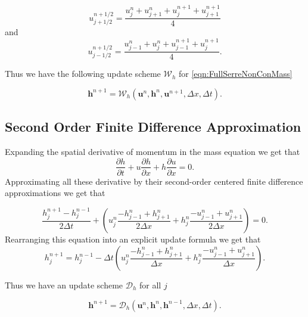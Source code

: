 	\begin{equation*}
	u^{n + 1/2}_{j+ 1/2} = \frac{ u^{n}_{j} + u^{n}_{j+1} + u^{n+1}_{j} +   u^{n+1}_{j+1}  }{4}
	\end{equation*}
	and
	\begin{equation*}
	u^{n + 1/2}_{j- 1/2} = \frac{u^{n}_{j-1}  + u^{n}_{j}+ u^{n+1}_{j-1} + u^{n+1}_{j}   }{4}.
	\end{equation*}

Thus we have the following update scheme $\mathcal{W}_h$ for \eqref{eqn:FullSerreNonConMass}

	\begin{equation}
	\boldsymbol{h}^{n+1} = \mathcal{W}_h\left(\boldsymbol{u}^n,\boldsymbol{h}^n,\boldsymbol{u}^{n+1}, \Delta x, \Delta t \right). 
	\label{eq:LWupdateh}
	\end{equation}

\subsection{Second Order Finite Difference Approximation}
Expanding the spatial derivative of momentum in the mass equation we get that	\begin{equation*}
\frac{\partial h}{\partial t} + u\dfrac{\partial h}{\partial x} + h\dfrac{\partial u}{\partial x} = 0.
\end{equation*}
Approximating all these derivative by their second-order centered finite difference approximations we get that

	\begin{equation*}
	\frac{h^{n+1}_j -h^{n-1}_j} {2 \Delta t} + \left(u^{n}_{j}\frac{ - h^{n}_{j-1} + h^{n}_{j+1}}{2 \Delta x} + h^{n}_{j}\frac{- u^{n}_{j-1} + u^{n}_{j+1}}{2\Delta x}\right) = 0.
	\end{equation*}
Rearranging this equation into an explicit update formula we get that		
	\begin{equation*}
	h^{n+1}_j = h^{n-1}_j - \Delta t \left(u^{n}_{j}\frac{ - h^{n}_{j-1} + h^{n}_{j+1}}{\Delta x} + h^{n}_{j}\frac{- u^{n}_{j-1} + u^{n}_{j+1}}{\Delta x}\right).
	\end{equation*}

Thus we have an update scheme $\mathcal{D}_h$ for all $j$

	\begin{equation}
	\label{eq:secondFDappformass}
	\boldsymbol{h}^{n+1} = \mathcal{D}_h\left(\boldsymbol{u}^n,\boldsymbol{h}^n,\boldsymbol{h}^{n-1} ,\Delta x, \Delta t \right).
	\end{equation}



